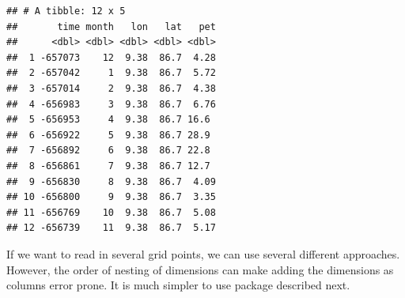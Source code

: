 \documentclass[krantz2]{krantz}\usepackage{knitr}%
\begin{document}
\begin{knitrout}\footnotesize
{}\color{fgcolor}\begin{kframe}
\begin{alltt}
 \hlkwb{<-}
    \hlstd{(} \hlstd{=}  \hlstd{),}
            \hlstd{=} \hlstd{(}\hlstd{(}\hlstd{)} \hlopt{+} 
            \hlstd{= longitude[}\hlstd{],}
            \hlstd{= latitude[}\hlstd{],}
            \hlstd{=}  \hlstd{)[}\hlstd{,} \hlstd{, ]}
           \hlstd{)}
\end{alltt}
\begin{verbatim}
## # A tibble: 12 x 5
##       time month   lon   lat   pet
##      <dbl> <dbl> <dbl> <dbl> <dbl>
##  1 -657073    12  9.38  86.7  4.28
##  2 -657042     1  9.38  86.7  5.72
##  3 -657014     2  9.38  86.7  4.38
##  4 -656983     3  9.38  86.7  6.76
##  5 -656953     4  9.38  86.7 16.6 
##  6 -656922     5  9.38  86.7 28.9 
##  7 -656892     6  9.38  86.7 22.8 
##  8 -656861     7  9.38  86.7 12.7 
##  9 -656830     8  9.38  86.7  4.09
## 10 -656800     9  9.38  86.7  3.35
## 11 -656769    10  9.38  86.7  5.08
## 12 -656739    11  9.38  86.7  5.17
\end{verbatim}
\end{kframe}
\end{knitrout}

If we want to read in several grid points, we can use several different approaches. However, the order of nesting of dimensions can make adding the dimensions as columns error prone. It is much simpler to use package  described next. 

\subsection[tidync]{}
\end{document}
